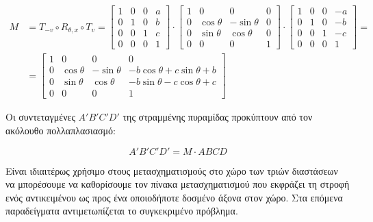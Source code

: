 \begin{solution}
\begin{align*}
	M & = T_{-v} \circ R_{\theta, x} \circ T_v 	= 
		\begin{bmatrix}
			1 & 0 & 0 & a \\
			0 & 1 & 0 & b \\
			0 & 0 & 1 & c \\
			0 & 0 & 0 & 1
		\end{bmatrix} 
	\cdot 
		\begin{bmatrix}
			1 & 0 & 0 & 0 \\
			0 & \cos{\theta} & -\sin{\theta} & 0 \\
			0 & \sin{\theta} & \cos{\theta} & 0 \\
			0 & 0 & 0 & 1
		\end{bmatrix}
	\cdot 
		\begin{bmatrix}
			1 & 0 & 0 & -a \\
			0 & 1 & 0 & -b \\
			0 & 0 & 1 & -c \\
			0 & 0 & 0 & 1
		\end{bmatrix}  = \\
	&=	
	\begin{bmatrix}
			1 & 0 & 0 & 0 \\
			0 & \cos{\theta} & -\sin{\theta} & -b\cos{\theta} + c\sin{\theta} + b \\
			0 & \sin{\theta} & \cos{\theta} & -b\sin{\theta}-c\cos{\theta} + c \\
			0 & 0 & 0 & 1
		\end{bmatrix}  
\end{align*}

		Οι συντεταγμένες $A'B'C'D'$ της στραμμένης πυραμίδας προκύπτουν από τον ακόλουθο πολλαπλασιασμό: 
		
\[
	A'B'C'D' = M \cdot ABCD
\]		
	
\begin{remark}
	Είναι ιδιαιτέρως χρήσιμο στους μετασχηματισμούς στο χώρο των τριών διαστάσεων να μπορέσουμε να καθορίσουμε τον πίνακα μετασχηματισμού που εκφράζει τη στροφή ενός αντικειμένου ως προς ένα οποιοδήποτε δοσμένο άξονα στον χώρο. Στα επόμενα παραδείγματα αντιμετωπίζεται το συγκεκριμένο πρόβλημα.	
\end{remark}

	
\end{solution}